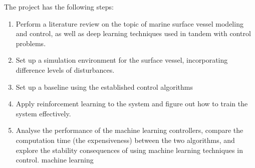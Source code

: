 \documentclass{article}
\begin{document}
The project has the following steps:
\begin{enumerate}
\item Perform a literature review on the topic of marine surface
  vessel modeling and control, as well as deep learning techniques
  used in tandem with control problems.
\item Set up a simulation environment for the surface vessel,
  incorporating difference levels of disturbances.
\item Set up a baseline using the established control algorithms
\item Apply reinforcement learning to the system and figure out how to
  train the system effectively.
\item Analyse the performance of the machine learning controllers,
  compare the computation time (the expensiveness) between the two
  algorithms, and explore the stability consequences of using machine
  learning techniques in control.  machine learning
\end{enumerate}
\end{document}
